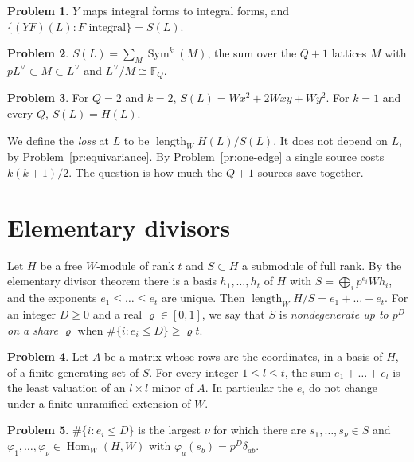 \documentclass[reqno]{amsart}
\theoremstyle{definition}
\newtheorem{problem}{Problem}[section]
\theoremstyle{plain}
\newcommand{\F}{\mathbb{F}}
\newcommand{\Sym}{\operatorname{Sym}}
\newcommand{\Hom}{\operatorname{Hom}}
\newcommand{\len}{\operatorname{length}}
\begin{document}
\begin{problem}\label{pr:hecke-integral}
\(Y\) maps integral forms to integral forms, and \(\{(YF)(L) : F \text{ integral}\} = S(L)\).
\end{problem}

\begin{problem}\label{pr:dual-side}
\(S(L) = \sum_M \Sym^k(M)\), the sum over the \(Q + 1\) lattices \(M\) with \(pL^\vee \subset M \subset L^\vee\) and \(L^\vee/M \cong \F_Q\).
\end{problem}

\begin{problem}\label{pr:small}
For \(Q = 2\) and \(k = 2\), \(S(L) = Wx^2 + 2Wxy + Wy^2\).  For \(k = 1\) and every \(Q\), \(S(L) = H(L)\).
\end{problem}

We define the \emph{loss} at \(L\) to be \(\len_W H(L)/S(L)\).  It does not depend on \(L\), by Problem~\ref{pr:equivariance}.  By Problem~\ref{pr:one-edge} a single source costs \(k(k+1)/2\).  The question is how much the \(Q + 1\) sources save together.

\section{Elementary divisors}\label{sec:smith}

Let \(H\) be a free \(W\)-module of rank \(t\) and \(S \subset H\) a submodule of full rank.  By the elementary divisor theorem \cite[Ch.~III, \S7]{La} there is a basis \(h_1, \dots, h_t\) of \(H\) with \(S = \bigoplus_i p^{e_i} W h_i\), and the exponents \(e_1 \le \dots \le e_t\) are unique.  Then \(\len_W H/S = e_1 + \dots + e_t\).  For an integer \(D \ge 0\) and a real \(\varrho \in [0,1]\), we say that \(S\) is \emph{nondegenerate up to \(p^D\) on a share \(\varrho\)} when \(\#\{i : e_i \le D\} \ge \varrho t\).

\begin{problem}\label{pr:minors}
Let \(A\) be a matrix whose rows are the coordinates, in a basis of \(H\), of a finite generating set of \(S\).  For every integer \(1 \le l \le t\), the sum \(e_1 + \dots + e_l\) is the least valuation of an \(l \times l\) minor of \(A\).  In particular the \(e_i\) do not change under a finite unramified extension of \(W\).
\end{problem}

\begin{problem}\label{pr:good-count}
\(\#\{i : e_i \le D\}\) is the largest \(\nu\) for which there are \(s_1, \dots, s_\nu \in S\) and \(\varphi_1, \dots, \varphi_\nu \in \Hom_W(H, W)\) with \(\varphi_a(s_b) = p^D \delta_{ab}\).
\end{problem}
\end{document}
